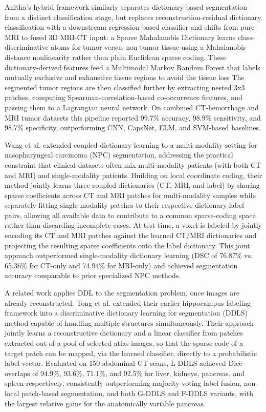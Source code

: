Anitha's \cite{anitha2024brain} hybrid framework similarly separates dictionary-based segmentation from a distinct classification stage, but replaces
reconstruction-residual dictionary classification with a downstream regression-based classifier and shifts from pure MRI to fused
3D MRI-CT input: a Sparse Mahalanobis Dictionary learns class-discriminative atoms for tumor versus non-tumor tissue using a
Mahalanobis-distance nonlinearity rather than plain Euclidean sparse coding. These dictionary-derived features feed a
Multimodal Markov Random Forest that labels mutually exclusive and exhaustive tissue regions to avoid the tissue loss
The segmented tumor regions are then classified further by extracting nested 3x3 patches,
computing Spearman-correlation-based co-occurrence features, and passing them to a Lagrangian neural network. On
combined CT-hemorrhage and MRI tumor datasets this pipeline reported 99.7\% accuracy, 98.9\% sensitivity, and 98.7\% specificity,
outperforming CNN, CapsNet, ELM, and SVM-based baselines.

Wang et al.\cite{wang2018tumor} extended coupled dictionary learning to a multi-modality setting for nasopharyngeal carcinoma (NPC) segmentation,
addressing the practical constraint that clinical datasets often mix multi-modality patients (with both CT and MRI) and
single-modality patients. Building on local coordinate coding, their method jointly learns three coupled
dictionaries (CT, MRI, and label) by sharing sparse coefficients across CT and MRI patches for multi-modality samples while
separately fitting single-modality patches to their respective dictionary-label pairs, allowing all available data to contribute
to a common sparse-coding space rather than discarding incomplete cases. At test time, a voxel is labeled by jointly encoding its
CT and MRI patches against the learned CT/MRI dictionaries and projecting the resulting sparse coefficients onto the label
dictionary. This joint approach outperformed single-modality dictionary learning (DSC of 76.87\% vs. 65.36\% for CT-only and 74.94\%
for MRI-only) and achieved segmentation accuracy comparable to prior specialized NPC methods.

A related work applies DDL to the segmentation problem, once images are already reconstructed.
Tong et al.\cite{tong2015discriminative} extended their earlier hippocampus-labeling framework into a discriminative dictionary learning
for segmentation (DDLS) method capable of handling multiple structures simultaneously. Their approach jointly learns a reconstructive
dictionary and a linear classifier from patches extracted out of a pool of selected atlas images, so that the sparse code of a
target patch can be mapped, via the learned classifier, directly to a probabilistic label vector.
Evaluated on 150 abdominal CT scans, L-DDLS achieved Dice overlaps of 94.9\%, 93.6\%, 71.1\%, and 92.5\% for liver, kidneys, pancreas,
and spleen respectively, consistently outperforming majority-voting label fusion, non-local patch-based segmentation, and both
G-DDLS and F-DDLS variants, with the largest relative gains for the anatomically variable pancreas.


